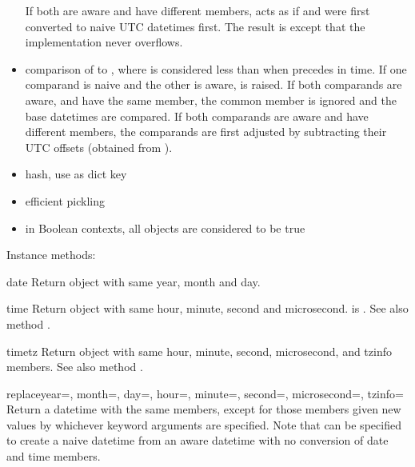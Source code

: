 \begin{itemize}
    If both are aware and have different  members,
     acts as if  and  were first converted to
    naive UTC datetimes first.  The result is
    except that the implementation never overflows.

  \item
    comparison of  to ,
    where  is considered less than 
    when  precedes  in time.  If one comparand is naive and
    the other is aware,  is raised.  If both
    comparands are aware, and have the same  member,
    the common  member is ignored and the base datetimes
    are compared.  If both comparands are aware and have different
     members, the comparands are first adjusted by
    subtracting their UTC offsets (obtained from ).

  \item
    hash, use as dict key

  \item
    efficient pickling

  \item
    in Boolean contexts, all  objects are considered
    to be true
\end{itemize}

Instance methods:

\begin{methoddesc}{date}{}
  Return  object with same year, month and day.
\end{methoddesc}

\begin{methoddesc}{time}{}
  Return  object with same hour, minute, second and microsecond.
   is .  See also method .
\end{methoddesc}

\begin{methoddesc}{timetz}{}
  Return  object with same hour, minute, second, microsecond,
  and tzinfo members.  See also method .
\end{methoddesc}

\begin{methoddesc}{replace}{year=, month=, day=, hour=, minute=, second=,
                            microsecond=, tzinfo=}
  Return a datetime with the same members, except for those members given
  new values by whichever keyword arguments are specified.  Note that
   can be specified to create a naive datetime from
  an aware datetime with no conversion of date and time members.
\end{methoddesc}

